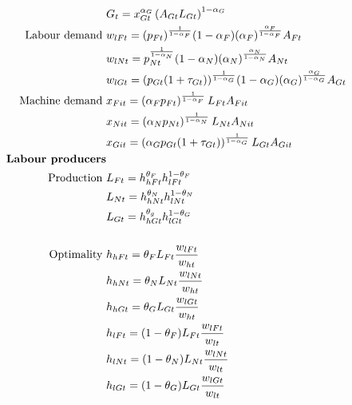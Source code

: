 \begin{align}
&G_t=  x_{Gt}^{\alpha_G}\left(A_{Gt}L_{Gt}\right)^{1-\alpha_G} %
\label{mod:G}\\
\text{Labour demand}\ \vspace{4mm}%
& w_{lFt}=(p_{Ft})^\frac{1}{1-\alpha_F}(1-\alpha_F)(\alpha_F)^\frac{\alpha_F}{1-\alpha_F}A_{Ft}\nonumber\\
& w_{lNt}=p_{Nt}^\frac{1}{1-\alpha_N}(1-\alpha_N)(\alpha_N)^\frac{\alpha_N}{1-\alpha_N}A_{Nt}\nonumber\\
& w_{lGt}=(p_{Gt}(1+\tau_{Gt}))^\frac{1}{1-\alpha_G}(1-\alpha_G)(\alpha_G)^\frac{\alpha_G}{1-\alpha_G}A_{Gt}\nonumber
\\
\text{Machine demand}\ \vspace{4mm}
&x_{Fit}= \left(\alpha_F p_{Ft}\right)^\frac{1}{1-\alpha_F}L_{Ft}A_{Fit}\nonumber\\
&x_{Nit}= \left(\alpha_N p_{Nt}\right)^\frac{1}{1-\alpha_N}L_{Nt}A_{Nit}\nonumber\\
&x_{Git}= \left(\alpha_G p_{Gt}(1+\tau_{Gt})\right)^\frac{1}{1-\alpha_G}L_{Gt}A_{Git}\nonumber
\\
\text{\textbf{Labour producers}}&\nonumber
\\
\text{Production}\ \vspace{4mm}& L_{Ft}=h_{hFt}^{\theta_{F}}h_{lFt}^{1-\theta_{F}}\label{mod:LF}\\
& L_{Nt}=h_{hNt}^{\theta_{N}}h_{lNt}^{1-\theta_{N}}\label{mod:LN}\\
& L_{Gt}=h_{hGt}^{\theta_{g}}h_{lGt}^{1-\theta_{G}}\label{mod:LG}\\
\ \\
\text{Optimality}\ \vspace{4mm}& h_{hFt}= \theta_{F}L_{Ft}\frac{w_{lFt}}{w_{ht}}\nonumber\\ %
& h_{hNt}= \theta_{N}L_{Nt}\frac{w_{lNt}}{w_{ht}}\nonumber\\
& h_{hGt}= \theta_{G}L_{Gt}\frac{w_{lGt}}{w_{ht}}\nonumber\\
& h_{lFt}= (1-\theta_{F})L_{Ft}\frac{w_{lFt}}{w_{lt}}\nonumber\\%
& h_{lNt}= (1-\theta_{N}) L_{Nt}\frac{w_{lNt}}{w_{lt}}\nonumber\\
& h_{lGt}= (1-\theta_{G}) L_{Gt}\frac{w_{lGt}}{w_{lt}}\nonumber\\

\end{align}
